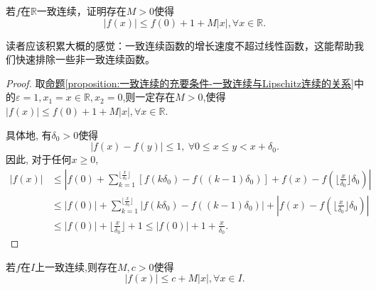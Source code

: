 \documentclass[../../main.tex]{subfiles}%
\begin{document}
\begin{corollary}[一致连续函数被线性函数控制]\label{corollary:一致连续函数被线性函数控制}
若\(f\)在\(\mathbb{R}\)一致连续，证明存在\(M>0\)使得
\[
|f(x)|\leqslant f(0) + 1 + M|x|,\forall x\in\mathbb{R}.
\]
\end{corollary}
\begin{note}
读者应该积累大概的感觉：一致连续函数的增长速度不超过线性函数，这能帮助我们快速排除一些非一致连续函数。
\end{note}
\begin{proof}

取\hyperref[proposition:一致连续的充要条件-一致连续与Lipschitz连续的关系]{命题\ref{proposition:一致连续的充要条件-一致连续与Lipschitz连续的关系}}中的$\varepsilon=1,x_1=x\in \mathbb{R},x_2=0$,则一定存在$M>0$,使得\(
|f(x)|\leqslant f(0) + 1 + M|x|,\forall x\in\mathbb{R}\).

具体地, 有$\delta_0 > 0$使得
\[
| f(x) - f(y) |\leqslant 1,\ \forall 0 \leqslant x \leqslant y < x + \delta_0.
\]
因此, 对于任何$x \geqslant 0$,
\begin{align*}
|f(x)|&\leqslant \left| f\left( 0 \right) +\sum_{k=1}^{\lfloor \frac{x}{\delta _0} \rfloor}{\left[ f\left( k\delta _0 \right) -f\left( \left( k-1 \right) \delta _0 \right) \right]}+f\left( x \right) -f\left( \lfloor \frac{x}{\delta _0} \rfloor \delta _0 \right) \right|
\\
&\leqslant |f(0)|+\sum_{k=1}^{\lfloor \frac{x}{\delta _0} \rfloor}{\left| f\left( k\delta _0 \right) -f\left( \left( k-1 \right) \delta _0 \right) \right|}+\left| f\left( x \right) -f\left( \lfloor \frac{x}{\delta _0} \rfloor \delta _0 \right) \right|
\\
&\leqslant |f(0)|+\lfloor \frac{x}{\delta _0} \rfloor +1\leqslant |f(0)|+1+\frac{x}{\delta _0}.
\end{align*}

\end{proof}

\begin{corollary}\label{corollary:一致连续函数被线性函数控制1}
若\(f\)在$I$上一致连续,则存在\(M,c>0\)使得
\[
|f(x)|\leqslant c + M|x|,\forall x\in I.
\]
\end{corollary}
\end{document}
